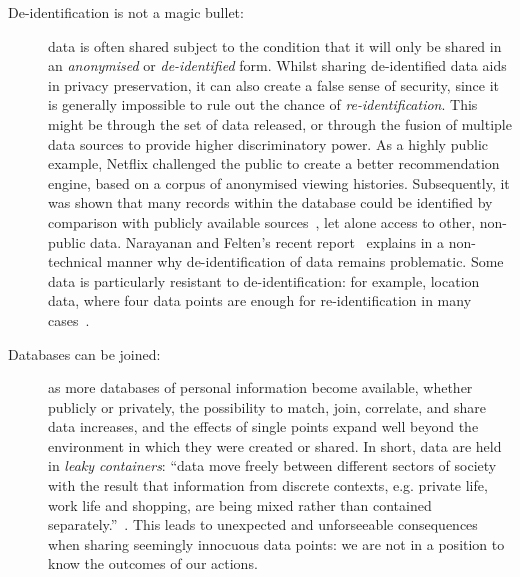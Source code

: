 \documentclass{IOS-Book-Article}     %
\newcommand{\tbox}[3][red]{{
\color{#1}\noindent{
   \fbox{\scriptsize{ {\bf #2} \textsl{#3}}}
   \vspace{2pt}
}
}}
\newcommand{\todo}[1]{\tbox{TODO:}{#1}}
\begin{document}
\begin{description}
\item[De-identification is not a magic bullet:] data is often shared subject to
the condition that it will only be shared in an \emph{anonymised} or
\emph{de-identified} form. Whilst sharing de-identified data aids in privacy
preservation, it can also create a false sense of security, since it is
generally impossible to rule out the chance of \emph{re-identification}.
This might be through the set of data released, or through the fusion of
multiple data sources to provide higher discriminatory power. 
As a highly public example, Netflix challenged the public
to create a better recommendation engine, based on a corpus of anonymised
viewing histories. Subsequently, it was shown that many records within the
database could be identified by comparison with publicly available
sources~\cite{narayanan2008Deanon}, let alone access to other, non-public data.
Narayanan and Felten's recent report~\cite{narayanan2014Deidentification}
explains in a non-technical manner why de-identification of data remains
problematic. Some data is particularly resistant to de-identification: for
example, location data, where four data points
are enough for re-identification in many cases~\cite{montjoye2013Unique}.

\item[Databases can be joined:] as more databases of personal information
become available, whether publicly or privately, the possibility to match, join,
correlate, and share data increases, and the effects of single points expand well
beyond the environment in which they were created or shared. In short, data are
held in \emph{leaky containers}: ``data move freely between different sectors of
society with the result that information from discrete contexts, e.g.
private life, work life and shopping, are being mixed rather than contained 
separately.''~\cite[p.37--44]{lyon2001surveillance}. This leads to unexpected
and unforseeable consequences when sharing seemingly innocuous data points: we
are not in a position to know the outcomes of our actions.
\end{description}


\end{document}
